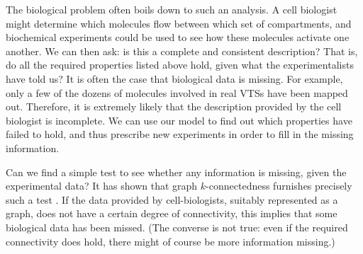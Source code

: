 The biological problem often boils down to such an analysis. A cell biologist might determine which molecules flow between which set of compartments, and biochemical experiments could be used to see how these molecules activate one another. We can then ask: is this a complete and consistent description? That is, do all the required properties listed above hold, given what the experimentalists have told us? It is often the case that biological data is missing. For example, only a few of the dozens of molecules involved in real VTSs have been mapped out. Therefore, it is extremely likely that the description provided by the cell biologist is incomplete. We can use our model to find out which properties have failed to hold, and thus prescribe new experiments in order to fill in the missing information.

Can we find a simple test to see whether any information is missing, given the experimental data? It has shown that graph $k$-connectedness furnishes precisely such a test \cite{shukla2017discovering}.
%
If the data provided by cell-biologists, suitably represented as a graph, does not have a certain degree of connectivity, this implies that some biological data has been missed. (The converse is not true: even if the required connectivity does hold, there might of course be more information missing.)




